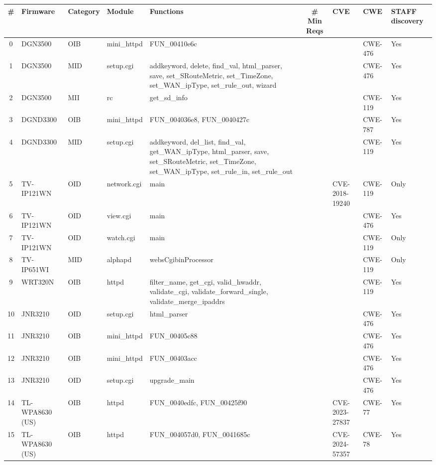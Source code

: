 \begin{table}[h]
\centering
\begin{tabular}{|c|l|l|l|l|c|l|l|l|}
\hline
{\sc \#} & {\sc Firmware} & {\sc Category} & {\sc Module} & {\sc Functions} & {\sc \# Min Reqs} & {\sc CVE} & {\sc CWE} & {\sc STAFF discovery} \\
\hline
0 & DGN3500 & OIB & mini\_httpd & FUN\_00410e6c &  &  & CWE-476 & Yes \\
\hline
1 & DGN3500 & MID & setup.cgi & addkeyword, delete, find\_val, html\_parser, save, set\_SRouteMetric, set\_TimeZone, set\_WAN\_ipType, set\_rule\_out, wizard &  &  & CWE-476 & Yes \\
\hline
2 & DGN3500 & MII & rc & get\_sd\_info &  &  & CWE-119 & Yes \\
\hline
3 & DGND3300 & OIB & mini\_httpd & FUN\_004036e8, FUN\_0040427c &  &  & CWE-787 & Yes \\
\hline
4 & DGND3300 & MID & setup.cgi & addkeyword, del\_list, find\_val, get\_WAN\_ipType, html\_parser, save, set\_SRouteMetric, set\_TimeZone, set\_WAN\_ipType, set\_rule\_in, set\_rule\_out &  &  & CWE-119 & Yes \\
\hline
5 & TV-IP121WN & OID & network.cgi & main &  & CVE-2018-19240 & CWE-119 & Only \\
\hline
6 & TV-IP121WN & OID & view.cgi & main &  &  & CWE-476 & Yes \\
\hline
7 & TV-IP121WN & OID & watch.cgi & main &  &  & CWE-119 & Only \\
\hline
8 & TV-IP651WI & MID & alphapd & websCgibinProcessor &  &  & CWE-119 & Only \\
\hline
9 & WRT320N & OIB & httpd & filter\_name, get\_cgi, valid\_hwaddr, validate\_cgi, validate\_forward\_single, validate\_merge\_ipaddrs &  &  & CWE-119 & Yes \\
\hline
10 & JNR3210 & OID & setup.cgi & html\_parser &  &  & CWE-476 & Yes \\
\hline
11 & JNR3210 & OIB & mini\_httpd & FUN\_00405c88 &  &  & CWE-476 & Yes \\
\hline
12 & JNR3210 & OIB & mini\_httpd & FUN\_00403acc &  &  & CWE-476 & Yes \\
\hline
13 & JNR3210 & OID & setup.cgi & upgrade\_main &  &  & CWE-476 & Yes \\
\hline
14 & TL-WPA8630 (US) & OIB & httpd & FUN\_0040edfc, FUN\_00425f90 &  & CVE-2023-27837 & CWE-77 & Yes \\
\hline
15 & TL-WPA8630 (US) & OIB & httpd & FUN\_004057d0, FUN\_0041685c &  & CVE-2024-57357 & CWE-78 & Yes \\

\end{tabular}
\end{table}
